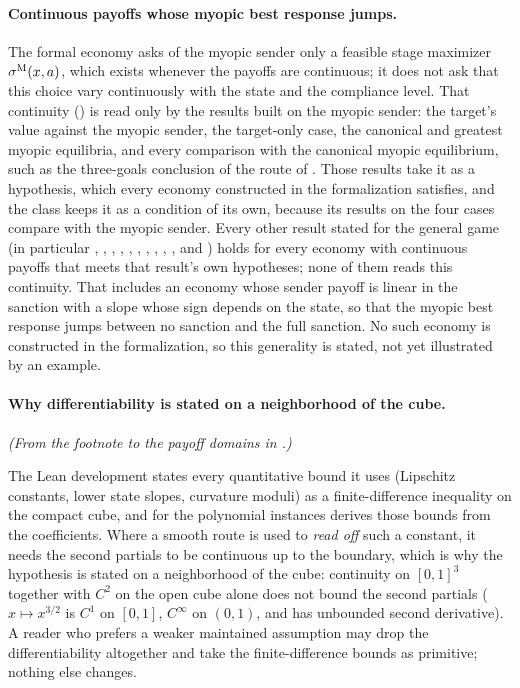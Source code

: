 \paragraph{Continuous payoffs whose myopic best response jumps.}

The formal economy asks of the myopic sender only a feasible stage maximizer
$\sigma^{\mathrm{M}}(x,a)$, which exists whenever the payoffs are continuous; it does not ask
that this choice vary continuously with the state and the compliance level.
That continuity () is read only by the
results built on the myopic sender: the target's value against the myopic
sender, the target-only case, the canonical and
greatest myopic equilibria, and every comparison with the canonical myopic
equilibrium, such as the three-goals conclusion of the route of
. Those results take it as a hypothesis, which every
economy constructed in the formalization satisfies, and the class
keeps it as a condition of its own, because its
results on the four cases compare with the myopic sender. Every other result
stated for the general game (in particular ,
, ,
, , ,
, , ,
,  and
) holds for every economy with continuous
payoffs that meets that result's own hypotheses; none of them reads this
continuity. That includes an economy whose sender payoff is linear in the sanction
with a slope whose sign depends on the state, so that the myopic best response
jumps between no sanction and the full sanction. No such economy is constructed
in the formalization, so this generality is stated, not yet illustrated by an example.

\paragraph{Why differentiability is stated on a neighborhood of the cube.} \emph{(From the footnote to the payoff domains in .)}

The Lean development states every quantitative bound it uses
(Lipschitz constants, lower state slopes, curvature moduli) as a
finite-difference inequality on the compact cube, and for the polynomial
instances derives those bounds from the coefficients. Where a
smooth route is used to \emph{read off} such a constant, it needs
the second partials to be continuous up to the boundary, which is
why the hypothesis is stated on a neighborhood of the cube:
continuity on $[0,1]^3$ together with $C^2$ on the open cube alone
does not bound the second partials ($x \mapsto x^{3/2}$ is $C^1$ on
$[0,1]$, $C^\infty$ on $(0,1)$, and has unbounded second
derivative). A reader who prefers a weaker maintained assumption may
drop the differentiability altogether and take the finite-difference bounds as
primitive; nothing else changes.

